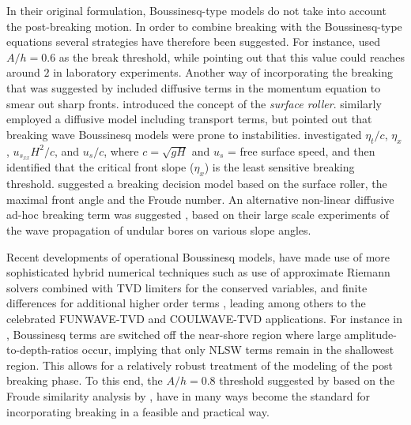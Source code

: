 \documentclass[review]{elsarticle}
\begin{document}
In their original formulation, Boussinesq-type models do not take into account 
the post-breaking motion. In order to combine breaking with  the Boussinesq-type equations
several strategies have therefore been suggested. For instance, \citep{peregrine1967long} used $A/h=0.6$ 
as the break threshold, while pointing out that this value could reaches around $2$ in laboratory experiments. 
Another way of incorporating the breaking that was suggested by \cite{Kennedy2000} included diffusive terms
in the momentum equation to smear out sharp fronts. \citet{schaffer1993boussinesq} introduced the concept of the {\em surface roller}. \citet{Lovholt:2013a} similarly employed a diffusive model including transport terms,
but pointed out that breaking wave Boussinesq models were prone to instabilities. \citet{lynett2006nearshore} investigated $\eta_t/c$, $\eta_x$, $u_{s_{xx}} H^2/c$, and $u_s/c$, 
where $c=\sqrt{gH}$ and $u_s$ = free surface speed, and then identified that the critical front slope ($\eta_x$) 
is the least sensitive breaking threshold. \citet{tissier2012new} suggested
a breaking decision model based on the surface roller, the maximal front angle and the Froude number.
An alternative non-linear diffusive ad-hoc breaking term was suggested \citet{matsuyama2007study},
based on their large scale experiments of the wave propagation of undular bores on various slope angles. 

Recent developments of operational Boussinesq models, have made use of more sophisticated hybrid numerical techniques
such as use of approximate Riemann solvers combined with TVD limiters for the conserved variables, and finite differences
for additional higher order terms \citep{Erduran2005,Kim2009,shi2012high}, leading among others to the celebrated
FUNWAVE-TVD and COULWAVE-TVD applications. For instance in \citet{shi2012high}, Boussinesq terms are 
switched off the near-shore region where large amplitude-to-depth-ratios occur,
implying that only NLSW terms remain in the shallowest region.
This allows for a relatively robust treatment of the modeling of the post breaking phase. To this end,
the $A/h = 0.8$ threshold suggested by \citep{shi2012high} 
based on the Froude similarity analysis by \citet{tonelli2009hybrid}, have in many ways become the standard for incorporating
breaking in a feasible and practical way.
\end{document}
